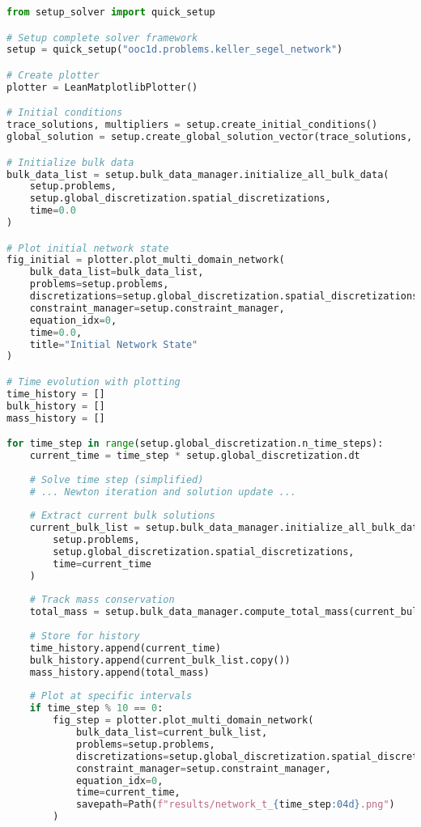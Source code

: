 \begin{lstlisting}[language=Python, caption=Expected Framework Integration]
from setup_solver import quick_setup

# Setup complete solver framework
setup = quick_setup("ooc1d.problems.keller_segel_network")

# Create plotter
plotter = LeanMatplotlibPlotter()

# Initial conditions
trace_solutions, multipliers = setup.create_initial_conditions()
global_solution = setup.create_global_solution_vector(trace_solutions, multipliers)

# Initialize bulk data
bulk_data_list = setup.bulk_data_manager.initialize_all_bulk_data(
    setup.problems,
    setup.global_discretization.spatial_discretizations,
    time=0.0
)

# Plot initial network state
fig_initial = plotter.plot_multi_domain_network(
    bulk_data_list=bulk_data_list,
    problems=setup.problems,
    discretizations=setup.global_discretization.spatial_discretizations,
    constraint_manager=setup.constraint_manager,
    equation_idx=0,
    time=0.0,
    title="Initial Network State"
)

# Time evolution with plotting
time_history = []
bulk_history = []
mass_history = []

for time_step in range(setup.global_discretization.n_time_steps):
    current_time = time_step * setup.global_discretization.dt
    
    # Solve time step (simplified)
    # ... Newton iteration and solution update ...
    
    # Extract current bulk solutions
    current_bulk_list = setup.bulk_data_manager.initialize_all_bulk_data(
        setup.problems,
        setup.global_discretization.spatial_discretizations,
        time=current_time
    )
    
    # Track mass conservation
    total_mass = setup.bulk_data_manager.compute_total_mass(current_bulk_list)
    
    # Store for history
    time_history.append(current_time)
    bulk_history.append(current_bulk_list.copy())
    mass_history.append(total_mass)
    
    # Plot at specific intervals
    if time_step % 10 == 0:
        fig_step = plotter.plot_multi_domain_network(
            bulk_data_list=current_bulk_list,
            problems=setup.problems,
            discretizations=setup.global_discretization.spatial_discretizations,
            constraint_manager=setup.constraint_manager,
            equation_idx=0,
            time=current_time,
            savepath=Path(f"results/network_t_{time_step:04d}.png")
        )


\end{lstlisting}
